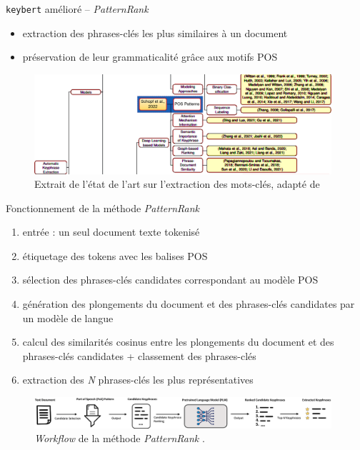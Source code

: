 \begin{frame}{\texttt{keybert} amélioré -- \textit{PatternRank}}
\begin{itemize}[<+->]
\item extraction des phrases-clés les plus similaires à un document
\item préservation de leur grammaticalité grâce aux motifs POS
\end{itemize}
\begin{figure}
    \centering
    \includegraphics[width=110mm,scale=0.5]{pic/sota_lm_adapte.png}
    \caption{Extrait de l'état de l'art sur l'extraction des mots-clés, adapté de \citet{xie2023}}
    \label{fig:enter-label}
\end{figure}
\end{frame}

\begin{frame}{Fonctionnement de la méthode \textit{PatternRank}}
\begin{enumerate}[<+->]
\item entrée : un seul document texte tokenisé
\item étiquetage des tokens avec les balises POS
\item sélection des phrases-clés candidates correspondant au modèle POS 
\item génération des plongements du document et des phrases-clés candidates par un modèle de langue
\item calcul des similarités cosinus entre les plongements du document et des phrases-clés candidates + classement des phrases-clés
\item extraction des \textit{N} phrases-clés les plus représentatives
\end{enumerate}
\begin{figure}
    \centering
    \includegraphics[width=110mm,scale=0.5]{pic/patternrank_workflow.png}
    \caption{\textit{Workflow} de la méthode \textit{PatternRank} \citep{schopf2022}.}
    \label{fig:enter-label}
\end{figure}
\end{frame}

